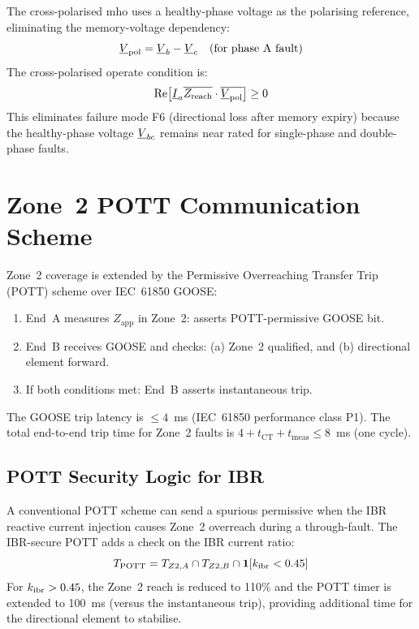 The cross-polarised mho uses a healthy-phase voltage as the polarising
reference, eliminating the memory-voltage dependency:
\begin{equation}
  \underline{V}_\mathrm{pol} = \underline{V}_b - \underline{V}_c
    \quad\text{(for phase~A fault)}
  \label{eq:ch5_crosspol}
\end{equation}
The cross-polarised operate condition is:
\begin{equation}
  \mathrm{Re}\!\left[\underline{I}_a \overline{Z_\mathrm{reach}}
    \cdot \overline{\underline{V}_\mathrm{pol}}\right] \geq 0
  \label{eq:ch5_crosspol_operate}
\end{equation}
This eliminates failure mode F6 (directional loss after memory expiry)
because the healthy-phase voltage $\underline{V}_{bc}$ remains near rated
for single-phase and double-phase faults.

\section{Zone~2 POTT Communication Scheme}
\label{sec:ch7_pott}

Zone~2 coverage is extended by the Permissive Overreaching Transfer Trip
(POTT) scheme over IEC~61850 GOOSE:
\begin{enumerate}
\item End~A measures $Z_\mathrm{app}$ in Zone~2: asserts POTT-permissive
      GOOSE bit.
\item End~B receives GOOSE and checks: (a) Zone~2 qualified, and
      (b) directional element forward.
\item If both conditions met: End~B asserts instantaneous trip.
\end{enumerate}
The GOOSE trip latency is $\leq 4$~ms (IEC~61850 performance class P1).
The total end-to-end trip time for Zone~2 faults is $4 + t_\mathrm{CT} +
t_\mathrm{meas} \leq 8$~ms (one cycle).

\subsection{POTT Security Logic for IBR}

A conventional POTT scheme can send a spurious permissive when the IBR
reactive current injection causes Zone~2 overreach during a through-fault.
The IBR-secure POTT adds a check on the IBR current ratio:
\begin{equation}
  T_\mathrm{POTT} = T_{Z2,A} \cap T_{Z2,B} \cap
    \mathbf{1}\!\left[k_\mathrm{ibr} < 0.45\right]
  \label{eq:ch5_pott_ibr}
\end{equation}
For $k_\mathrm{ibr} > 0.45$, the Zone~2 reach is reduced to 110\% and the POTT
timer is extended to 100~ms (versus the instantaneous trip), providing
additional time for the directional element to stabilise.

